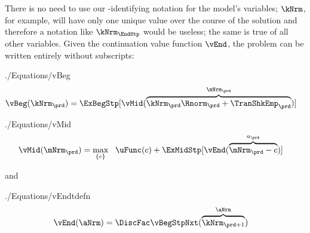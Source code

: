 \documentclass[\econtexRoot/SolvingMicroDSOPs]{subfiles}
\begin{document}
There is no need to use our {\move}-identifying notation for the model's variables; $\kNrm$, for example, will have only one unique value over the course of the solution and therefore a notation like $\kNrm_{\EndStp}$ would be useless; the same is true of all other variables.  Given the continuation value function $\vEnd$, the problem can be written entirely without {\interval} subscripts:
\begin{verbatimwrite}{./Equations/vBeg}
  \begin{equation}\begin{gathered}\begin{aligned}
        \vBeg(\kNrm_{\prd}) & = \ExBegStp[\vMid(\overbrace{\kNrm_{\prd} \Rnorm_{\prd} + \TranShkEmp_{\prd}}^{\mNrm_{\prd}})]  \label{eq:vBeg}
      \end{aligned}\end{gathered}\end{equation}
\end{verbatimwrite}
\unskip
\begin{verbatimwrite}{./Equations/vMid}
  \begin{equation}\begin{gathered}\begin{aligned}
        \vMid(\mNrm_{\prd}) & = \max_{\{{c}\}}~~\uFunc({c}) +\ExMidStp[ \vEnd(\overbrace{\mNrm_{\prd}-{c}}^{a_{\prd}})] \label{eq:vMid}
      \end{aligned}\end{gathered}\end{equation}
\end{verbatimwrite}
\unskip
and
\begin{verbatimwrite}{./Equations/vEndtdefn}
  \begin{equation}\begin{gathered}\begin{aligned}
        \vEnd(\aNrm) & = \DiscFac \vBegStpNxt(\overbrace{\kNrm_{\prd+1}}^{\aNrm}) \label{eq:vEndtdefn}
      \end{aligned}\end{gathered}\end{equation}
\end{verbatimwrite}
\unskip
\end{document}

